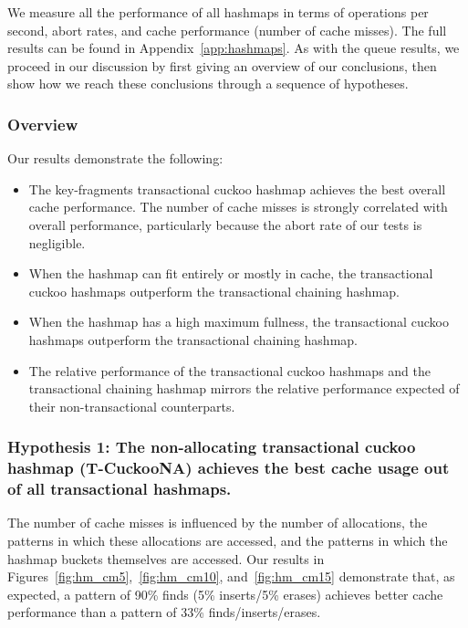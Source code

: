 We measure all the performance of all hashmaps in terms of operations per second, abort rates, and cache performance (number of cache misses). 
The full results can be found in Appendix~\ref{app:hashmaps}. As with the queue results, we proceed in our discussion by first giving an overview of our conclusions, then show how we reach these conclusions through a sequence of hypotheses.

\subsubsection{Overview}
Our results demonstrate the following:
\begin{itemize}
    \item The key-fragments transactional cuckoo hashmap achieves the best overall cache performance. The number of cache misses is strongly correlated with overall performance, particularly because the abort rate of our tests is negligible.
    \item When the hashmap can fit entirely or mostly in cache, the transactional cuckoo hashmaps outperform the transactional chaining hashmap.
    \item When the hashmap has a high maximum fullness, the transactional cuckoo hashmaps outperform the transactional chaining hashmap.
    \item The relative performance of the transactional cuckoo hashmaps and the transactional chaining hashmap mirrors the relative performance expected of their non-transactional counterparts.
\end{itemize}

\subsubsection{Hypothesis 1: The non-allocating transactional cuckoo hashmap (T-CuckooNA) achieves the best cache usage out of all transactional hashmaps.}
\label{section:hmcm}

The number of cache misses is influenced by the number of allocations, the patterns in which these allocations are accessed, and the patterns in which the hashmap buckets themselves are accessed. Our results in Figures~\ref{fig:hm_cm5},~\ref{fig:hm_cm10}, and~\ref{fig:hm_cm15} demonstrate that, as expected, a pattern of 90\% finds (5\% inserts/5\% erases) achieves better cache performance than a pattern of 33\% finds/inserts/erases.

